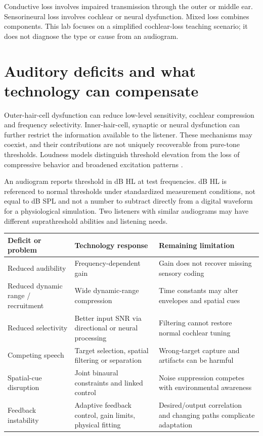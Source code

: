 \documentclass[11pt,a4paper]{article}
\begin{document}
Conductive loss involves impaired transmission through the outer or middle ear. Sensorineural loss involves cochlear or neural dysfunction. Mixed loss combines components. This lab focuses on a simplified cochlear-loss teaching scenario; it does not diagnose the type or cause from an audiogram.
\newpage
\section{Auditory deficits and what technology can compensate}
Outer-hair-cell dysfunction can reduce low-level sensitivity, cochlear compression and frequency selectivity. Inner-hair-cell, synaptic or neural dysfunction can further restrict the information available to the listener. These mechanisms may coexist, and their contributions are not uniquely recoverable from pure-tone thresholds. Loudness models distinguish threshold elevation from the loss of compressive behavior and broadened excitation patterns \cite{moore2014}.

An audiogram reports threshold in dB HL at test frequencies. dB HL is referenced to normal thresholds under standardized measurement conditions, not equal to dB SPL and not a number to subtract directly from a digital waveform for a physiological simulation. Two listeners with similar audiograms may have different suprathreshold abilities and listening needs.

\begin{tabularx}{\linewidth}{@{}p{.23\linewidth}YY@{}}\toprule
Deficit or problem & Technology response & Remaining limitation\\\midrule
Reduced audibility & Frequency-dependent gain & Gain does not recover missing sensory coding\\
Reduced dynamic range / recruitment & Wide dynamic-range compression & Time constants may alter envelopes and spatial cues\\
Reduced selectivity & Better input SNR via directional or neural processing & Filtering cannot restore normal cochlear tuning\\
Competing speech & Target selection, spatial filtering or separation & Wrong-target capture and artifacts can be harmful\\
Spatial-cue disruption & Joint binaural constraints and linked control & Noise suppression competes with environmental awareness\\
Feedback instability & Adaptive feedback control, gain limits, physical fitting & Desired/output correlation and changing paths complicate adaptation\\\bottomrule
\end{tabularx}
\end{document}
